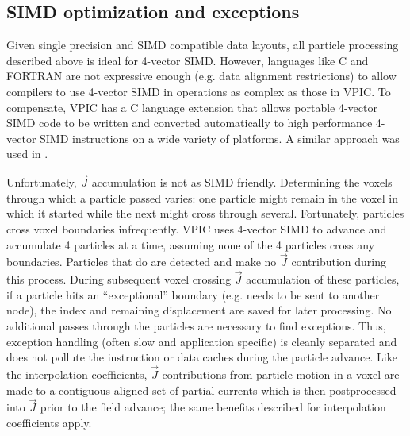 \documentclass[letter,10pt]{article}
\newcommand{\vecJ}{\vec{J}}
\begin{document}
\subsection{SIMD optimization and exceptions}

Given single precision and SIMD compatible data layouts, all particle
processing described above is ideal for 4-vector SIMD.  However,
languages like C and FORTRAN are not expressive enough (e.g. data
alignment restrictions) to allow compilers to use 4-vector SIMD in
operations as complex as those in VPIC.  To compensate, VPIC has a C
language extension that allows portable 4-vector SIMD code to be
written and converted automatically to high performance 4-vector SIMD
instructions on a wide variety of platforms.  A similar approach was
used in \cite{Bowers_et_al_2006}.


Unfortunately, $\vecJ$ accumulation is not as SIMD friendly.
Determining the voxels through which a particle passed varies: one
particle might remain in the voxel in which it started while the next
might cross through several.  Fortunately, particles cross voxel
boundaries infrequently.  VPIC uses 4-vector SIMD to advance and
accumulate 4 particles at a time, assuming none of the 4 particles
cross any boundaries.  Particles that do are detected and make no
$\vecJ$ contribution during this process.  During subsequent voxel
crossing $\vecJ$ accumulation of these particles, if a particle hits
an ``exceptional'' boundary (e.g. needs to be sent to another node), the
index and remaining displacement are saved for later processing.  No
additional passes through the particles are necessary to find
exceptions.  Thus, exception handling (often slow and application
specific) is cleanly separated and does not pollute the instruction or
data caches during the particle advance.  Like the interpolation
coefficients, $\vecJ$ contributions from particle motion in a voxel
are made to a contiguous aligned set of partial currents which is then
postprocessed into $\vecJ$ prior to the field advance; the same
benefits described for interpolation coefficients apply.
\end{document}
